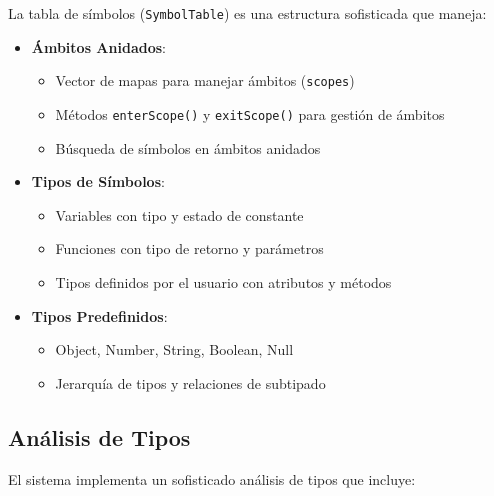 \documentclass[11pt, a4paper, twoside]{article} %
\begin{document}
La tabla de símbolos (\texttt{SymbolTable}) es una estructura sofisticada que maneja:

\begin{itemize}
    \item \textbf{\'Ambitos Anidados}:
    \begin{itemize}
        \item Vector de mapas para manejar ámbitos (\texttt{scopes})
        \item Métodos \texttt{enterScope()} y \texttt{exitScope()} para gestión de ámbitos
        \item Búsqueda de símbolos en ámbitos anidados
    \end{itemize}

    \item \textbf{Tipos de S\'imbolos}:
    \begin{itemize}
        \item Variables con tipo y estado de constante
        \item Funciones con tipo de retorno y parámetros
        \item Tipos definidos por el usuario con atributos y métodos
    \end{itemize}

    \item \textbf{Tipos Predefinidos}:
    \begin{itemize}
        \item Object, Number, String, Boolean, Null
        \item Jerarquía de tipos y relaciones de subtipado
    \end{itemize}
\end{itemize}

\subsection{An\'alisis de Tipos}

El sistema implementa un sofisticado análisis de tipos que incluye:
\end{document}
